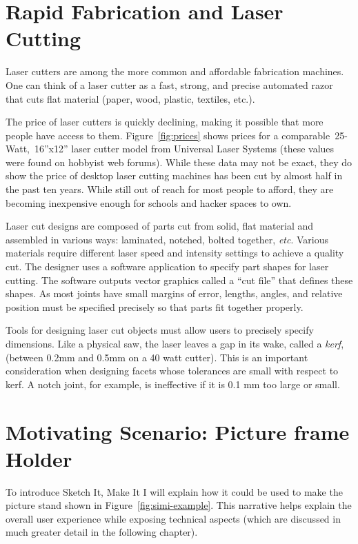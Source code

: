 \section{Rapid Fabrication and Laser Cutting}

Laser cutters are among the more common and affordable fabrication
machines. One can think of a laser cutter as a fast, strong, and
precise automated razor that cuts flat material (paper, wood, plastic,
textiles, etc.). 



The price of laser cutters is quickly declining, making it possible
that more people have access to them. Figure~\ref{fig:prices} shows
prices for a comparable~25-Watt,~16''x12'' laser cutter model from
Universal Laser Systems (these values were found on hobbyist web
forums). While these data may not be exact, they do show the price of
desktop laser cutting machines has been cut by almost half in the past
ten years. While still out of reach for most people to afford, they
are becoming inexpensive enough for schools and hacker spaces to own.

Laser cut designs are composed of parts cut from solid, flat material
and assembled in various ways: laminated, notched, bolted together,
\textit{etc}. Various materials require different laser speed and
intensity settings to achieve a quality cut. The designer uses a
software application to specify part shapes for laser cutting. The
software outputs vector graphics called a ``cut file'' that defines
these shapes. As most joints have small margins of error, lengths,
angles, and relative position must be specified precisely so that
parts fit together properly.

Tools for designing laser cut objects must allow users to precisely
specify dimensions. Like a physical saw, the laser leaves a gap in its
wake, called a \textit{kerf}, (between 0.2mm and 0.5mm on a 40 watt
cutter). This is an important consideration when designing facets
whose tolerances are small with respect to kerf. A notch joint, for
example, is ineffective if it is 0.1 mm too large or small.


\section{Motivating Scenario: Picture frame Holder}



To introduce Sketch It, Make It I will explain how it could be used to
make the picture stand shown in Figure~\ref{fig:simi-example}. This
narrative helps explain the overall user experience while exposing
technical aspects (which are discussed in much greater detail in the
following chapter).

